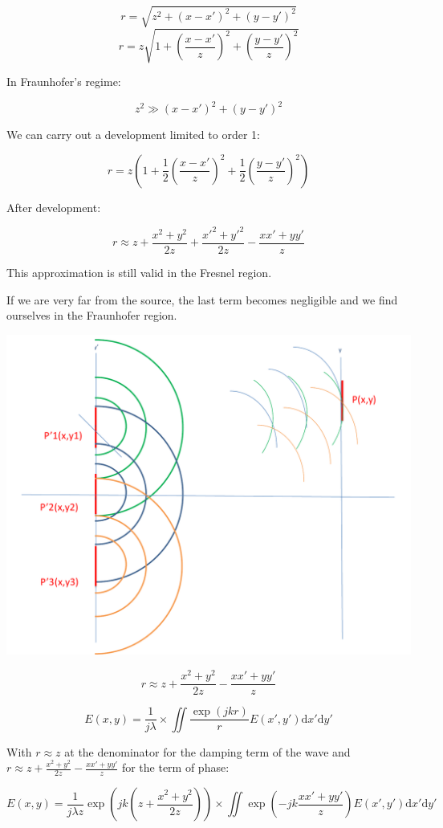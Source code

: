 \documentclass[10pt,a4paper]{article}
\begin{document}
\[r=\sqrt{z^2+(x-x')^2+(y-y')^2}\]
\[r=z\sqrt{1+\left(\frac{x-x'}{z}\right)^2+\left(\frac{y-y'}{z}\right)^2}\]

In Fraunhofer’s regime:

\[z^2\gg(x-x')^2+(y-y')^2\]

We can carry out a development limited to order 1: 

\[r=z\left(1+\frac{1}{2}\left(\frac{x-x'}{z}\right)^2+\frac{1}{2}\left(\frac{y-y'}{z}\right)^2\right)\]

After development:

\[r \approx z+\frac{x^2+y^2}{2z}+\frac{x'^2+y'^2}{2z}-\frac{xx'+yy'}{z}\]

This approximation is still valid in the Fresnel region. 

If we are very far from the source, the last term becomes negligible and we find ourselves in the Fraunhofer region.

\begin{center}
\includegraphics[scale=0.32]{./figures/schema-3-crop.png}
\end{center}

\[r \approx z+\frac{x^2+y^2}{2z}-\frac{xx'+yy'}{z}\]

\[
E(x,y)=\frac{1}{j\lambda} 
\times \iint \frac{\exp\left(jkr\right)}{r}
E(x',y')\mathrm{d}x'\mathrm{d}y'
\]

With $r\approx z$ at the denominator for the damping term of the wave and $r \approx z+\frac{x^2+y^2}{2z}-\frac{xx'+yy'}{z}$ for the term of phase:

\[
E(x,y)=\frac{1}{j\lambda z} \exp\left(jk\left(z+\frac{x^2+y^2}{2z}\right)\right)
\times \iint \exp\left(-jk\frac{xx'+yy'}{z}\right)
E(x',y')\mathrm{d}x'\mathrm{d}y'
\]
\end{document}
